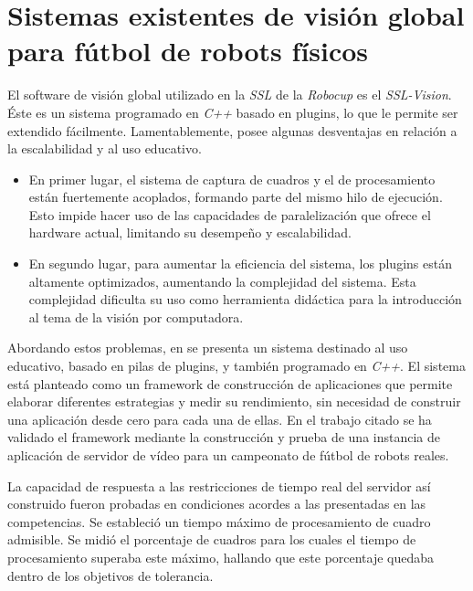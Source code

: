 
\section{Sistemas existentes de visión global para fútbol de robots físicos}


El software de visión global utilizado en la \emph{SSL} de la \emph{Robocup} es
el \emph{SSL-Vision}\cite{sslvision}. Éste es un sistema programado en
\emph{C++} basado en plugins, lo que le permite ser extendido fácilmente.
Lamentablemente, posee algunas desventajas en relación a la escalabilidad y al
uso educativo.

\begin{itemize}

	\item 	En primer lugar, el sistema de captura de cuadros y el de
		procesamiento están fuertemente acoplados, formando parte del
		mismo hilo de ejecución. Esto impide hacer uso de las
		capacidades de paralelización que ofrece el hardware actual,
		limitando su desempeño y escalabilidad.

	\item 	En segundo lugar, para aumentar la eficiencia del sistema, los
		plugins están altamente optimizados, aumentando la complejidad
		del sistema. Esta complejidad dificulta su uso como herramienta
		didáctica para la introducción al tema de la visión por
		computadora.

\end{itemize}

Abordando estos problemas, en \cite{torres2014} se presenta un sistema destinado
al uso educativo, basado en pilas de plugins, y también programado en
\emph{C++}. El sistema está planteado como un framework de construcción de
aplicaciones que permite elaborar diferentes estrategias y medir su rendimiento,
sin necesidad de construir una aplicación desde cero para cada una de ellas. En
el trabajo citado se ha validado el framework mediante la construcción y prueba
de una instancia de aplicación de servidor de vídeo para un campeonato de fútbol
de robots reales.

La capacidad de respuesta a las restricciones de tiempo real del servidor así
construido fueron probadas en condiciones acordes a las presentadas en las
competencias. Se estableció un tiempo máximo de procesamiento de cuadro
admisible. Se midió el porcentaje de cuadros para los cuales el tiempo de
procesamiento superaba este máximo, hallando que este porcentaje quedaba dentro
de los objetivos de tolerancia.

